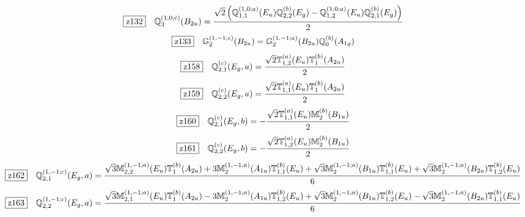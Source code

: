 \documentclass[fleqn,10pt,landscape]{jsarticle}
\begin{document}
\begin{dmath*}
\hspace*{3mm}\fbox{z132}\quad \mathbb{Q}_{3}^{(1,0;c)}(B_{2u})=\frac{\sqrt{2} \left(\mathbb{Q}_{1,1}^{(1,0;a)}(E_{u}) \mathbb{Q}_{2,2}^{(b)}(E_{g}) - \mathbb{Q}_{1,2}^{(1,0;a)}(E_{u}) \mathbb{Q}_{2,1}^{(b)}(E_{g})\right)}{2}
\end{dmath*}
\begin{dmath*}
\hspace*{3mm}\fbox{z133}\quad \mathbb{G}_{2}^{(1,-1;c)}(B_{2u})=\mathbb{G}_{2}^{(1,-1;a)}(B_{2u}) \mathbb{Q}_{0}^{(b)}(A_{1g})
\end{dmath*}
\begin{dmath*}
\hspace*{3mm}\fbox{z158}\quad \mathbb{Q}_{2,1}^{(c)}(E_{g},a)=\frac{\sqrt{2} \mathbb{T}_{1,2}^{(a)}(E_{u}) \mathbb{T}_{1}^{(b)}(A_{2u})}{2}
\end{dmath*}
\begin{dmath*}
\hspace*{3mm}\fbox{z159}\quad \mathbb{Q}_{2,2}^{(c)}(E_{g},a)=\frac{\sqrt{2} \mathbb{T}_{1,1}^{(a)}(E_{u}) \mathbb{T}_{1}^{(b)}(A_{2u})}{2}
\end{dmath*}
\begin{dmath*}
\hspace*{3mm}\fbox{z160}\quad \mathbb{Q}_{2,1}^{(c)}(E_{g},b)=- \frac{\sqrt{2} \mathbb{T}_{1,1}^{(a)}(E_{u}) \mathbb{M}_{2}^{(b)}(B_{1u})}{2}
\end{dmath*}
\begin{dmath*}
\hspace*{3mm}\fbox{z161}\quad \mathbb{Q}_{2,2}^{(c)}(E_{g},b)=- \frac{\sqrt{2} \mathbb{T}_{1,2}^{(a)}(E_{u}) \mathbb{M}_{2}^{(b)}(B_{1u})}{2}
\end{dmath*}
\begin{dmath*}
\hspace*{3mm}\fbox{z162}\quad \mathbb{Q}_{2,1}^{(1,-1;c)}(E_{g},a)=\frac{\sqrt{3} \mathbb{M}_{2,2}^{(1,-1;a)}(E_{u}) \mathbb{T}_{1}^{(b)}(A_{2u}) + 3 \mathbb{M}_{2}^{(1,-1;a)}(A_{1u}) \mathbb{T}_{1,1}^{(b)}(E_{u}) + \sqrt{3} \mathbb{M}_{2}^{(1,-1;a)}(B_{1u}) \mathbb{T}_{1,1}^{(b)}(E_{u}) + \sqrt{3} \mathbb{M}_{2}^{(1,-1;a)}(B_{2u}) \mathbb{T}_{1,2}^{(b)}(E_{u})}{6}
\end{dmath*}
\begin{dmath*}
\hspace*{3mm}\fbox{z163}\quad \mathbb{Q}_{2,2}^{(1,-1;c)}(E_{g},a)=\frac{\sqrt{3} \mathbb{M}_{2,1}^{(1,-1;a)}(E_{u}) \mathbb{T}_{1}^{(b)}(A_{2u}) - 3 \mathbb{M}_{2}^{(1,-1;a)}(A_{1u}) \mathbb{T}_{1,2}^{(b)}(E_{u}) + \sqrt{3} \mathbb{M}_{2}^{(1,-1;a)}(B_{1u}) \mathbb{T}_{1,2}^{(b)}(E_{u}) - \sqrt{3} \mathbb{M}_{2}^{(1,-1;a)}(B_{2u}) \mathbb{T}_{1,1}^{(b)}(E_{u})}{6}
\end{dmath*}
\end{document}
